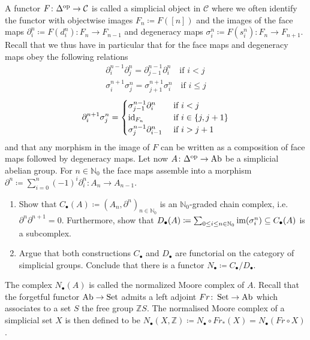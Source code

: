 \begin{Exercise}
	A functor $ F \colon \Delta^{ \operatorname{op} } \to \mathcal{ C } $ is called a simplicial object in $ \mathcal{ C } $ where we often identify the functor with objectwise images $ F_n \coloneqq F ( [ n ] ) $ and the images of the face maps $ \partial_i^n \coloneqq F ( d_i^n ) \colon F_n \to F_{ n - 1 } $ and degeneracy maps $ \sigma_i^n \coloneqq F ( s_i^n ) \colon F_n \to F_{ n + 1 } $.
	Recall that we thus have in particular that for the face maps and degeneracy maps obey the following relations
	\begin{align*}
		\partial_i^{ n - 1 } \partial_j^n = \partial_{ j - 1 }^{ n - 1 } \partial_i^n \quad \text{if } i < j
		\\
		\sigma_i^{ n + 1 } \sigma_j^n = \sigma_{ j + 1 }^{ n + 1 } \sigma_i^n \quad \text{if } i \leq j
	\end{align*}
	\[
	\partial_i^{ n + 1 } \sigma_j^n =
	\begin{cases}
		\sigma_{ j - 1 }^{ n - 1 } \partial_i^n & \text{ if } i < j 
		\\
		\operatorname{id}_{ F_n } & \text{ if } i \in \{ j , j + 1 \} 
		\\
		\sigma_{ j }^{ n - 1 } \partial_{ i - 1 }^n & \text{ if } i > j +1
	\end{cases}
	\]
	and that any morphism in the image of $ F $ can be written as a composition of face maps followed by degeneracy maps.
	Let now $ A \colon \Delta^{ \operatorname{op} } \to \operatorname{Ab} $ be a simplicial abelian group.
	For $ n \in \mathbb{ N }_0 $ the face maps assemble into a morphism $ \partial^n \coloneqq \sum_{ i = 0 }^n ( - 1 )^i \partial_i^n \colon A_n \to A_{ n - 1 } $.
	\begin{enumerate}[label=(\alph*)]
		\item 
		Show that $ C_{ \bullet } ( A ) \coloneqq ( A_n , \partial^n )_{ n \in \mathbb{ N }_0 } $ is an $ \mathbb{ N }_0 $-graded chain complex, i.e. $ \partial^n \partial^{ n + 1 } = 0 $.
		Furthermore, show that $ D_{ \bullet } ( A ) \coloneqq \sum_{ 0 \leq i \leq n \in \mathbb{ N }_0 } \operatorname{im} ( \sigma_i^n ) \subseteq C_{ \bullet } ( A ) $ is a subcomplex.
		
		\item 
		Argue that both constructions $ C_{ \bullet } $ and $ D_{ \bullet } $ are functorial on the category of simplicial groups.
		Conclude that there is a functor $ N_{ \bullet } \coloneqq C_{ \bullet } / D_{ \bullet } $.
	\end{enumerate}
	
	The complex $ N_{ \bullet } ( A ) $ is called the normalized Moore complex of $ A $.
	Recall that the forgetful functor $ \operatorname{Ab} \to \operatorname{Set} $ admits a left adjoint $ Fr \colon \operatorname{Set} \to \operatorname{Ab} $ which associates to a set $ S $ the free group $ \mathbb{ Z } S $. 
	The normalised Moore complex of a simplicial set $ X $ is then defined to be $ N_{ \bullet } ( X , \mathbb{ Z } ) \coloneqq N_{ \bullet } \circ Fr_* ( X ) = N_{ \bullet } ( Fr \circ X ) $.
	

\end{Exercise}
